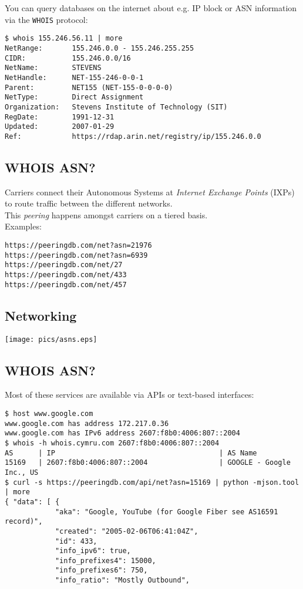 \documentclass[xga]{xdvislides}
\begin{document}
You can query databases on the internet about e.g. IP
block or ASN information via the {\tt WHOIS} protocol:

\begin{verbatim}
$ whois 155.246.56.11 | more
NetRange:       155.246.0.0 - 155.246.255.255
CIDR:           155.246.0.0/16
NetName:        STEVENS
NetHandle:      NET-155-246-0-0-1
Parent:         NET155 (NET-155-0-0-0-0)
NetType:        Direct Assignment
Organization:   Stevens Institute of Technology (SIT)
RegDate:        1991-12-31
Updated:        2007-01-29
Ref:            https://rdap.arin.net/registry/ip/155.246.0.0
\end{verbatim}

\subsection{WHOIS ASN?}
Carriers connect their Autonomous Systems at {\em
Internet Exchange Points} (IXPs) to route traffic
between the different networks.\\

This {\em peering} happens amongst carriers on a
tiered basis. \\

Examples:
\begin{verbatim}
https://peeringdb.com/net?asn=21976
https://peeringdb.com/net?asn=6939
https://peeringdb.com/net/27
https://peeringdb.com/net/433
https://peeringdb.com/net/457
\end{verbatim}

\subsection{Networking}
\vspace*{\fill}
\begin{center}
	\texttt{[image: pics/asns.eps]} \\
\end{center}
\vspace*{\fill}

\subsection{WHOIS ASN?}
Most of these services are available via APIs or
text-based interfaces:

\begin{verbatim}
$ host www.google.com
www.google.com has address 172.217.0.36
www.google.com has IPv6 address 2607:f8b0:4006:807::2004
$ whois -h whois.cymru.com 2607:f8b0:4006:807::2004
AS      | IP                                       | AS Name
15169   | 2607:f8b0:4006:807::2004                 | GOOGLE - Google Inc., US
$ curl -s https://peeringdb.com/api/net?asn=15169 | python -mjson.tool | more
{ "data": [ {
            "aka": "Google, YouTube (for Google Fiber see AS16591 record)",
            "created": "2005-02-06T06:41:04Z",
            "id": 433,
            "info_ipv6": true,
            "info_prefixes4": 15000,
            "info_prefixes6": 750,
            "info_ratio": "Mostly Outbound",
\end{verbatim}
\end{document}
